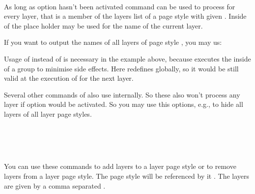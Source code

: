 \begin{Declaration}
  \\
\end{Declaration}
%
As long as \KOMAScript{} option  hasn't been
activated command  can be used to process
 for every layer, that is a member of the layers list of a page
style with given . Inside of  the place
holder  may be used for the name of the current layer.
\begin{Example}
  If you want to output the names of all layers of page style
  , you may us:
\begin{lstcode}
  \let\commaatlist\empty
  \ForEachLayerOfPageStyle{scrheadings}{%
    \commaatlist#1\gdef\commaatlist{, }}
\end{lstcode}
\end{Example}
Usage of  instead of  is necessary in the example
above, because  executes the 
inside of a group to minimise side effects. Here  redefines
 globally, so it would be still valid at the execution of
 for the next layer.

Several other commands of  also
use  internally. So these also won't process
any layer if \KOMAScript{} option  would be
activated. So you may use this options, e.g., to hide all layers of all layer
page styles.%
%

\begin{Declaration}
  \\
  \\
  \\
\end{Declaration}
%
%
%
%
You can use these commands to add layers to a layer page style or to remove 
layers from a layer page style. The page style will be referenced by it
. The layers are given by a comma separated
. 


